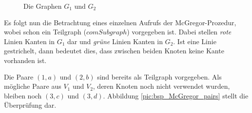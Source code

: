 \begin{figure}[htb]
\centering
\hspace*{\fill}
\hspace*{\fill}
\hspace*{\fill}
\caption{Die Graphen $G_1$ und $G_2$}
\label{pic:bsp_McGregor_graphs}
\end{figure}


Es folgt nun die Betrachtung eines einzelnen Aufrufs der McGregor-Prozedur, 
wobei schon ein Teilgraph ($comSubgraph$) vorgegeben ist. Dabei stellen \emph{rote} Linien 
Kanten in $G_1$ dar und \emph{grüne} Linien Kanten in $G_2$. Ist eine Linie 
gestrichelt, dann bedeutet dies, dass zwischen beiden Knoten keine Kante 
vorhanden ist.

Die Paare $(1,a)$ und $(2,b)$ sind bereits als Teilgraph vorgegeben. 
Als mögliche Paare aus $V_1$ und $V_2$, deren Knoten noch nicht 
verwendet wurden, bleiben noch $(3,c)$ und $(3,d)$. 
Abbildung \ref{pic:bsp_McGregor_pairs} stellt die Überprüfung dar.



